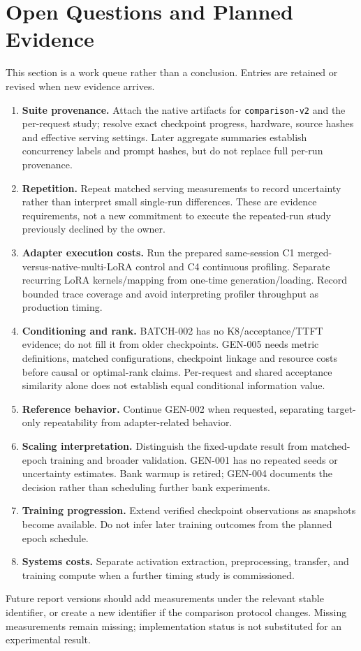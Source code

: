\section{Open Questions and Planned Evidence}
\label{sec:open}

This section is a work queue rather than a conclusion. Entries are retained or
revised when new evidence arrives.

\begin{enumerate}[leftmargin=*]
  \item \textbf{Suite provenance.} Attach the native artifacts for
  \texttt{comparison-v2} and the per-request study; resolve exact checkpoint
  progress, hardware, source hashes and effective serving settings. Later
  aggregate summaries establish concurrency labels and prompt hashes, but do
  not replace full per-run provenance.
  \item \textbf{Repetition.} Repeat matched serving measurements to record
  uncertainty rather than interpret small single-run differences. These are
  evidence requirements, not a new commitment to execute the repeated-run study
  previously declined by the owner.
  \item \textbf{Adapter execution costs.} Run the prepared same-session C1
  merged-versus-native-multi-LoRA control and C4 continuous profiling. Separate
  recurring LoRA kernels/mapping from one-time generation/loading. Record bounded
  trace coverage and avoid interpreting profiler throughput as production timing.
  \item \textbf{Conditioning and rank.} BATCH-002 has no K8/acceptance/TTFT
  evidence; do not fill it from older checkpoints. GEN-005 needs metric
  definitions, matched configurations, checkpoint linkage and resource costs
  before causal or optimal-rank claims. Per-request and shared acceptance
  similarity alone does not establish equal conditional information value.
  \item \textbf{Reference behavior.} Continue GEN-002 when requested, separating
  target-only repeatability from adapter-related behavior.
  \item \textbf{Scaling interpretation.} Distinguish the fixed-update result
  from matched-epoch training and broader validation. GEN-001 has no repeated
  seeds or uncertainty estimates. Bank warmup is retired; GEN-004 documents
  the decision rather than scheduling further bank experiments.
  \item \textbf{Training progression.} Extend verified checkpoint observations
  as snapshots become available. Do not infer later training outcomes from
  the planned epoch schedule.
  \item \textbf{Systems costs.} Separate activation extraction, preprocessing,
  transfer, and training compute when a further timing study is commissioned.
\end{enumerate}

Future report versions should add measurements under the relevant stable
identifier, or create a new identifier if the comparison protocol changes.
Missing measurements remain missing; implementation status is not substituted
for an experimental result.
